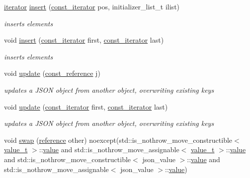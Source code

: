 \begin{DoxyCompactItemize}
\mbox{\hyperlink{classnlohmann_1_1basic__json_a099316232c76c034030a38faa6e34dca}{iterator}} \mbox{\hyperlink{classnlohmann_1_1basic__json_aa19b9b9ca6967295b102f1cc487b1ad7}{insert}} (\mbox{\hyperlink{classnlohmann_1_1basic__json_a41a70cf9993951836d129bb1c2b3126a}{const\+\_\+iterator}} pos, initializer\+\_\+list\+\_\+t ilist)
\begin{DoxyCompactList}\small\item\em inserts elements \end{DoxyCompactList}\item 
void \mbox{\hyperlink{classnlohmann_1_1basic__json_a1b0a4e60d56f1fe80501ed941e122892}{insert}} (\mbox{\hyperlink{classnlohmann_1_1basic__json_a41a70cf9993951836d129bb1c2b3126a}{const\+\_\+iterator}} first, \mbox{\hyperlink{classnlohmann_1_1basic__json_a41a70cf9993951836d129bb1c2b3126a}{const\+\_\+iterator}} last)
\begin{DoxyCompactList}\small\item\em inserts elements \end{DoxyCompactList}\item 
void \mbox{\hyperlink{classnlohmann_1_1basic__json_a1cfa9ae5e7c2434cab4cfe69bffffe11}{update}} (\mbox{\hyperlink{classnlohmann_1_1basic__json_a4057c5425f4faacfe39a8046871786ca}{const\+\_\+reference}} j)
\begin{DoxyCompactList}\small\item\em updates a J\+S\+ON object from another object, overwriting existing keys \end{DoxyCompactList}\item 
void \mbox{\hyperlink{classnlohmann_1_1basic__json_a27921dafadb3bbefd180235ec763e3ea}{update}} (\mbox{\hyperlink{classnlohmann_1_1basic__json_a41a70cf9993951836d129bb1c2b3126a}{const\+\_\+iterator}} first, \mbox{\hyperlink{classnlohmann_1_1basic__json_a41a70cf9993951836d129bb1c2b3126a}{const\+\_\+iterator}} last)
\begin{DoxyCompactList}\small\item\em updates a J\+S\+ON object from another object, overwriting existing keys \end{DoxyCompactList}\item 
void \mbox{\hyperlink{classnlohmann_1_1basic__json_a8c9d932353e1ab98a7dc2fc27e002031}{swap}} (\mbox{\hyperlink{classnlohmann_1_1basic__json_ac6a5eddd156c776ac75ff54cfe54a5bc}{reference}} other) noexcept(std\+::is\+\_\+nothrow\+\_\+move\+\_\+constructible$<$ \mbox{\hyperlink{namespacenlohmann_1_1detail_a90aa5ef615aa8305e9ea20d8a947980f}{value\+\_\+t}} $>$\+::\mbox{\hyperlink{classnlohmann_1_1basic__json_adcf8ca5079f5db993820bf50036bf45d}{value}} and std\+::is\+\_\+nothrow\+\_\+move\+\_\+assignable$<$ \mbox{\hyperlink{namespacenlohmann_1_1detail_a90aa5ef615aa8305e9ea20d8a947980f}{value\+\_\+t}} $>$\+::\mbox{\hyperlink{classnlohmann_1_1basic__json_adcf8ca5079f5db993820bf50036bf45d}{value}} and std\+::is\+\_\+nothrow\+\_\+move\+\_\+constructible$<$ json\+\_\+value $>$\+::\mbox{\hyperlink{classnlohmann_1_1basic__json_adcf8ca5079f5db993820bf50036bf45d}{value}} and std\+::is\+\_\+nothrow\+\_\+move\+\_\+assignable$<$ json\+\_\+value $>$\+::\mbox{\hyperlink{classnlohmann_1_1basic__json_adcf8ca5079f5db993820bf50036bf45d}{value}})

\end{DoxyCompactItemize}
